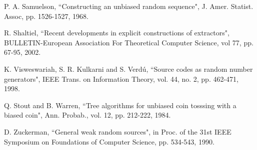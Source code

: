 \documentclass[journal]{IEEEtran}
\begin{document}
\begin{thebibliography}{1}
P. A. Samuelson, ``Constructing an unbiased random sequence", J. Amer. Statist. Assoc, pp. 1526-1527, 1968.

R. Shaltiel, ``Recent developments in explicit constructions of extractors", BULLETIN-European Association For Theoretical Computer Science, vol 77, pp. 67-95, 2002.

K. Visweswariah, S. R. Kulkarni and S. Verd\'{u}, ``Source codes as
random number generators", IEEE Trans. on Information Theory, vol.
44, no. 2, pp. 462-471,  1998.

Q. Stout and B. Warren, ``Tree algorithms for unbiased coin tosssing with a biased coin", Ann. Probab., vol. 12, pp. 212-222, 1984.

D. Zuckerman, ``General weak random sources", in Proc. of the 31st IEEE Symposium on Foundations of Computer Science, pp. 534-543, 1990.


\end{thebibliography}

%
%
%
%
%




\end{document}
